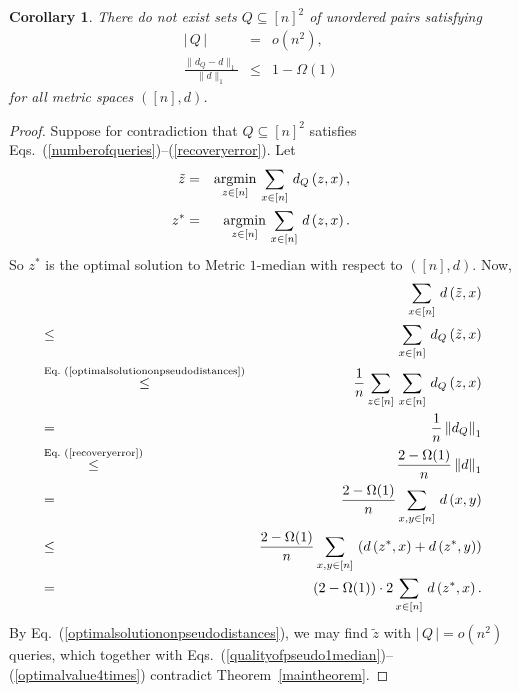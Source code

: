 \documentclass[letterpaper,12pt]{article}
\newtheorem{corollary}[theorem]{Corollary}
\newcommand{\comment}[1]{}
\begin{document}
{\begin{corollary}
There do not exist sets $Q\subseteq[n]^2$ of unordered pairs
satisfying
\begin{eqnarray}
|\,Q\,|&=&o\left(n^2\right),\label{numberofqueries}\\
\frac{\lVert d_Q-d\rVert_1}{\lVert d\rVert_1}&\le&
1-\Omega(1)\label{recoveryerror}
\end{eqnarray}
for all metric spaces $([n],d)$.
\end{corollary}
\begin{proof}
Suppose for contradiction that $Q\subseteq[n]^2$ satisfies
Eqs.~(\ref{numberofqueries})--(\ref{recoveryerror}).
Let
\begin{eqnarray}
\tilde{z}&=&\mathop{\rm argmin}_{z\in[n]}\,
\sum_{x\in[n]}\,d_Q\left(z,x\right),
\label{optimalsolutiononpseudodistances}\\
z^*&=&\mathop{\rm argmin}_{z\in[n]}\,\sum_{x\in[n]}\,d\left(z,x\right).
\nonumber
\end{eqnarray}
So $z^*$ is
the optimal solution to {\sc Metric $1$-median} with respect to $([n],d)$.
Now,
\begin{eqnarray}
&&\sum_{x\in[n]}\,d\left(\tilde{z},x\right)\label{qualityofpseudo1median}\\
&\le& \sum_{x\in[n]}\,d_Q\left(\tilde{z},x\right)\nonumber\\
&\stackrel{\text{Eq.~(\ref{optimalsolutiononpseudodistances})}}{\le}&
\frac{1}{n}\sum_{z\in[n]}\,\sum_{x\in[n]}\,d_Q\left(z,x\right)\nonumber\\
&=&\frac{1}{n}\left\lVert d_Q\right\rVert_1\nonumber\\
&\stackrel{\text{Eq.~(\ref{recoveryerror})}}{\le}&
\frac{2-\Omega(1)}{n}
\left\lVert d\right\rVert_1\nonumber\\
&=&\frac{2-\Omega(1)}{n}\sum_{x,y\in[n]}\,d\left(x,y\right)\nonumber\\
&\le&\frac{2-\Omega(1)}{n}\sum_{x,y\in[n]}\,\left(d\left(z^*,x\right)+d\left(z^*,y\right)\right)
\nonumber\\
&=&\left(2-\Omega(1)\right)\cdot
2\sum_{x\in[n]}\,d\left(z^*,x\right).\label{optimalvalue4times}
\end{eqnarray}
By Eq.~(\ref{optimalsolutiononpseudodistances}),
we may find $\tilde{z}$ with $|\,Q\,|=o(n^2)$ queries,
which together with
Eqs.~(\ref{qualityofpseudo1median})--(\ref{optimalvalue4times})
contradict Theorem~\ref{maintheorem}.
\end{proof}

\comment{\section{Additional section --- to be modified}

}}
\end{document}
